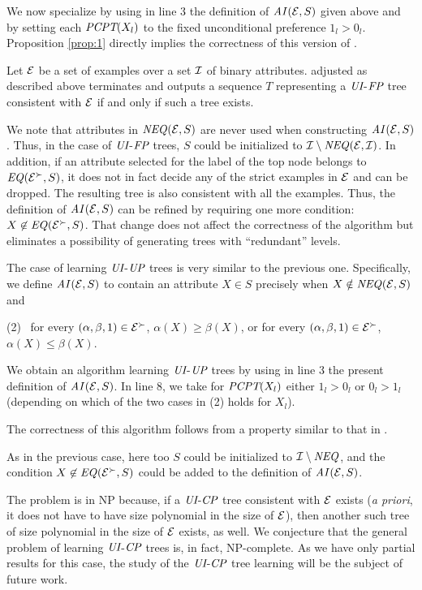 We now specialize  by using in line 3 the 
definition of $\mathit{AI}(\mathcal{E},S)$ given above and by setting each $\textit{PCPT}(X_l)$ 
to the fixed unconditional preference $1_l>0_l$. Proposition \ref{prop:1}
directly implies the correctness of this version of .

\begin{thm}
Let $\mathcal{E}$ be a set of examples over a set $\mathcal{I}$ of binary attributes.
 adjusted as described above terminates and outputs
a sequence $T$ representing a $\textit{UI}$-$\textit{FP}$ tree consistent with $\mathcal{E}$ if
and only if such a tree exists.
\end{thm}

We note that attributes in $\mathit{NEQ}(\mathcal{E},S)$ are never used when constructing
$\mathit{AI}(\mathcal{E},S)$. Thus, in the case of $\textit{UI}$-$\textit{FP}$ trees, $S$ could be
initialized to $\mathcal{I}\setminus\mathit{NEQ}(\mathcal{E},\mathcal{I})$. In addition, if an attribute
selected for the label of the top node belongs to $\mathit{EQ}(\mathcal{E}^\succ, S)$,
it does not in fact decide any of the strict examples in $\mathcal{E}$ and can be
dropped. The resulting tree is also consistent with all the examples. 
Thus, the definition of $\mathit{AI}(\mathcal{E},S)$ can be refined by requiring one more
condition: $X \not \in \mathit{EQ}(\mathcal{E}^\succ, S)$. That change does not affect 
the correctness of the algorithm but eliminates a possibility of generating
trees with ``redundant'' levels.


The case of learning $\textit{UI}$-$\textit{UP}$ trees is very similar to the 
previous one. Specifically, we define $\mathit{AI}(\mathcal{E},S)$ to contain an attribute 
$X\in S$ precisely when $X\notin\mathit{NEQ}(\mathcal{E},S)$ and

\noindent 
(2) \ for every $(\alpha,\beta,1) \in \mathcal{E}^\succ$, $\alpha(X) \geq 
\beta(X)$, or for every $(\alpha,\beta,1) \in \mathcal{E}^\succ$, $\alpha(X) \leq \beta(X)$.

We obtain an algorithm learning $\textit{UI}$-$\textit{UP}$ trees by using in line 3
the present definition of $\mathit{AI}(\mathcal{E},S)$. In line 8, we take for 
$\textit{PCPT}(X_l)$ either $1_l>0_l$ or $0_l>1_l$ (depending on which of the two
cases in (2) holds for $X_l$).

The correctness of this algorithm follows from a property similar to
that in .

As in the previous case, here too $S$ could be initialized to $\mathcal{I} \setminus
\mathit{NEQ}$, and the condition $X\not\in \mathit{EQ}(\mathcal{E}^\succ,S)$ could be added to the 
definition of $\mathit{AI}(\mathcal{E},S)$. 

The problem is in NP because, if a $\textit{UI}$-$\textit{CP}$
tree consistent with $\mathcal{E}$ exists (\emph{a priori},
it does not have to have size polynomial in the size of $\mathcal{E}$), then another
such tree of size polynomial in the size of $\mathcal{E}$ exists, as well.
We conjecture that the general problem of
learning $\textit{UI}$-$\textit{CP}$ trees is, in fact, NP-complete. 
As we have only partial results 
for this case, the study of the $\textit{UI}$-$\textit{CP}$ tree learning will be the subject
of future work. 


